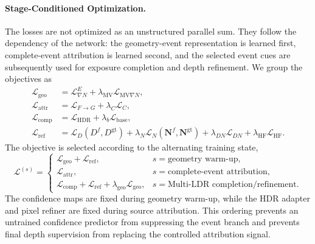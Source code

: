 \paragraph{Stage-Conditioned Optimization.}
The losses are not optimized as an unstructured parallel sum. They follow the
dependency of the network: the geometry-event representation is learned
first, complete-event attribution is learned second, and the selected event
cues are subsequently used for exposure completion and depth refinement. We
group the objectives as
\begin{align}
    \mathcal L_{\mathrm{geo}}
    &=\mathcal L_{\nabla N}^{E}
      +\lambda_{\mathrm{MV}}\mathcal L_{\mathrm{MV}\nabla N},\\
    \mathcal L_{\mathrm{attr}}
    &=\mathcal L_{F\rightarrow G}+\lambda_C\mathcal L_C,\\
    \mathcal L_{\mathrm{comp}}
    &=\mathcal L_{\mathrm{HDR}}+\lambda_b\mathcal L_{\mathrm{base}},\\
    \mathcal L_{\mathrm{ref}}
    &=\mathcal L_D(D^f,D^{\mathrm{gt}})
      +\lambda_N\mathcal L_N(\bm N^f,\bm N^{\mathrm{gt}})
      +\lambda_{DN}\mathcal L_{DN}
      +\lambda_{\mathrm{HF}}\mathcal L_{\mathrm{HF}}.
\end{align}
The objective is selected according to the alternating training state,
\begin{equation}
    \mathcal L^{(s)}=
    \begin{cases}
      \mathcal L_{\mathrm{geo}}+\mathcal L_{\mathrm{ref}},
      &s=\text{geometry warm-up},\\
      \mathcal L_{\mathrm{attr}},
      &s=\text{complete-event attribution},\\
      \mathcal L_{\mathrm{comp}}+\mathcal L_{\mathrm{ref}}
      +\lambda_{\mathrm{geo}}\mathcal L_{\mathrm{geo}},
      &s=\text{Multi-LDR completion/refinement}.
    \end{cases}
\end{equation}
The confidence maps are fixed during geometry warm-up, while the HDR adapter
and pixel refiner are fixed during source attribution. This ordering prevents
an untrained confidence predictor from suppressing the event branch and
prevents final depth supervision from replacing the controlled attribution
signal.

